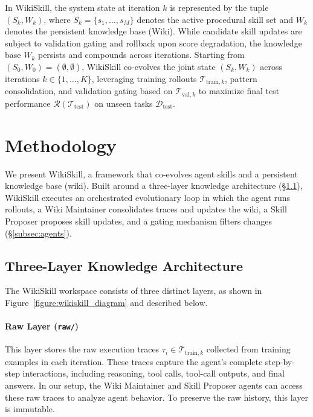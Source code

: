 \documentclass[11pt, a4paper, copyright, gr]{google}
\newcommand{\method}{WikiSkill\xspace}
\begin{document}
In \method, the system state at iteration $k$ is represented by the tuple $(S_k, W_k)$, where $S_k = \{s_1, \dots, s_M\}$ denotes the active procedural skill set and $W_k$ denotes the persistent knowledge base (Wiki). While candidate skill updates are subject to validation gating and rollback upon score degradation, the knowledge base $W_k$ persists and compounds across iterations. Starting from $(S_0, W_0) = (\emptyset, \emptyset)$, \method co-evolves the joint state $(S_k, W_k)$ across iterations $k \in \{1, \dots, K\}$, leveraging training rollouts $\mathcal{T}_{\text{train}, k}$, pattern consolidation, and validation gating based on $\mathcal{T}_{\text{val}, k}$ to maximize final test performance $\mathcal{R}(\mathcal{T}_{\text{test}})$ on unseen tasks $\mathcal{D}_{\text{test}}$.

\section{Methodology}
\label{sec:methodology}



We present \method, a framework that co-evolves agent skills and a persistent knowledge base (wiki). Built around a three-layer knowledge architecture (\S\ref{subsec:architecture}), \method executes an orchestrated evolutionary loop in which the agent runs rollouts, a Wiki Maintainer consolidates traces and updates the wiki, a Skill Proposer proposes skill updates, and a gating mechanism filters changes (\S\ref{subsec:agents}).

\subsection{Three-Layer Knowledge Architecture}
\label{subsec:architecture}

The \method workspace consists of three distinct layers, as shown in Figure~\ref{figure:wikiskill_diagram} and described below.

\paragraph{Raw Layer (\texttt{raw/})}
This layer stores the raw execution traces $\tau_i \in \mathcal{T}_{\text{train}, k}$ collected from training examples in each iteration. These traces capture the agent's complete step-by-step interactions, including reasoning, tool calls, tool-call outputs, and final answers. In our setup, the Wiki Maintainer and Skill Proposer agents can access these raw traces to analyze agent behavior. To preserve the raw history, this layer is immutable.
\end{document}
